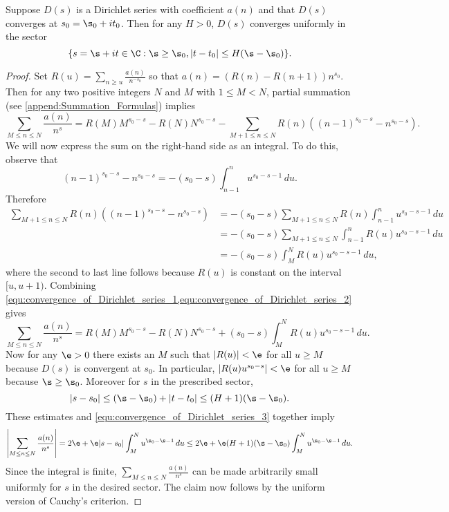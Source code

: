     \begin{theorem}\label{thm:convergence_of_Dirichlet_series}
      Suppose $D(s)$ is a Dirichlet series with coefficient $a(n)$ and that $D(s)$ converges at $s_{0} = \s_{0}+it_{0}$. Then for any $H > 0$, $D(s)$ converges uniformly in the sector
      \[
        \{s = \s+it \in \C:\s \ge \s_{0}, |t-t_{0}| \le H(\s-\s_{0})\}.
      \]
    \end{theorem}
    \begin{proof}
      Set $R(u) = \sum_{n \ge u}\frac{a(n)}{n^{-s_{0}}}$ so that $a(n) = (R(n)-R(n+1))n^{s_{0}}$. Then for any two positive integers $N$ and $M$ with $1 \le M < N$, partial summation (see \cref{append:Summation_Formulas}) implies
      \begin{equation}\label{equ:convergence_of_Dirichlet_series_1}
        \sum_{M \le n \le N}\frac{a(n)}{n^{s}} = R(M)M^{s_{0}-s}-R(N)N^{s_{0}-s}-\sum_{M+1 \le n \le N}R(n)((n-1)^{s_{0}-s}-n^{s_{0}-s}).
      \end{equation}
      We will now express the sum on the right-hand side as an integral. To do this, observe that
      \[
        (n-1)^{s_{0}-s}-n^{s_{0}-s} = -(s_{0}-s)\int_{n-1}^{n}u^{s_{0}-s-1}\,du.
      \]
      Therefore
      \begin{equation}\label{equ:convergence_of_Dirichlet_series_2}
        \begin{aligned}
          \sum_{M+1 \le n \le N}R(n)((n-1)^{s_{0}-s}-n^{s_{0}-s}) &= -(s_{0}-s)\sum_{M+1 \le n \le N}R(n)\int_{n-1}^{n}u^{s_{0}-s-1}\,du \\
          &= -(s_{0}-s)\sum_{M+1 \le n \le N}\int_{n-1}^{n}R(u)u^{s_{0}-s-1}\,du \\
          &= -(s_{0}-s)\int_{M}^{N}R(u)u^{s_{0}-s-1}\,du,
        \end{aligned}
      \end{equation}
      where the second to last line follows because $R(u)$ is constant on the interval $[u,u+1)$. Combining \cref{equ:convergence_of_Dirichlet_series_1,equ:convergence_of_Dirichlet_series_2} gives
      \begin{equation}\label{equ:convergence_of_Dirichlet_series_3}
        \sum_{M \le n \le N}\frac{a(n)}{n^{s}} = R(M)M^{s_{0}-s}-R(N)N^{s_{0}-s}+(s_{0}-s)\int_{M}^{N}R(u)u^{s_{0}-s-1}\,du.
      \end{equation}
      Now for any $\e > 0$ there exists an $M$ such that $|R(u)| < \e$ for all $u \ge M$ because $D(s)$ is convergent at $s_{0}$. In particular, $|R(u)u^{s_{0}-s}| < \e$ for all $u \ge M$ because $\s \ge \s_{0}$. Moreover for $s$ in the prescribed sector,
      \[
        |s-s_{0}| \le (\s-\s_{0})+|t-t_{0}| \le (H+1)(\s-\s_{0}).
      \]
      These estimates and \cref{equ:convergence_of_Dirichlet_series_3} together imply
      \[
        \left|\sum_{M \le n \le N}\frac{a(n)}{n^{s}}\right| = 2\e+\e|s-s_{0}|\int_{M}^{N}u^{\s_{0}-\s-1}\,du \le 2\e+\e(H+1)(\s-\s_{0})\int_{M}^{N}u^{\s_{0}-\s-1}\,du.
      \]
      Since the integral is finite, $\sum_{M \le n \le N}\frac{a(n)}{n^{s}}$ can be made arbitrarily small uniformly for $s$ in the desired sector. The claim now follows by the uniform version of Cauchy's criterion.
    \end{proof}
    
